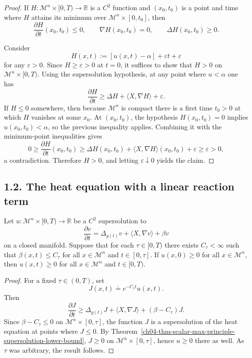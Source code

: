 \begin{proof}
If \(H : \mathcal M^n \times [0,T) \to \mathbb R\) is a \(C^2\) function and \((x_0,t_0)\) is a point and time where \(H\) attains its minimum over \(\mathcal M^n \times [0,t_0]\), then
\[
\frac{\partial H}{\partial t}(x_0,t_0) \le 0,\qquad \nabla H(x_0,t_0)=0,\qquad \Delta H(x_0,t_0)\ge 0.
\]

Consider
\[
H(x,t) := [u(x,t)-\alpha]+\varepsilon t+\varepsilon
\]
for any \(\varepsilon>0\). Since \(H\ge \varepsilon>0\) at \(t=0\), it suffices to show that \(H>0\) on \(\mathcal M^n \times [0,T)\). Using the supersolution hypothesis, at any point where \(u<\alpha\) one has
\[
\frac{\partial H}{\partial t}\ge \Delta H + \langle X,\nabla H\rangle+\varepsilon.
\]
If \(H\le 0\) somewhere, then because \(\mathcal M^n\) is compact there is a first time \(t_0>0\) at which \(H\) vanishes at some \(x_0\). At \((x_0,t_0)\), the hypothesis \(H(x_0,t_0)=0\) implies \(u(x_0,t_0)<\alpha\), so the previous inequality applies. Combining it with the minimum-point inequalities gives
\[
0\ge \frac{\partial H}{\partial t}(x_0,t_0)\ge \Delta H(x_0,t_0)+\langle X,\nabla H\rangle(x_0,t_0)+\varepsilon\ge \varepsilon>0,
\]
a contradiction. Therefore \(H>0\), and letting \(\varepsilon \downarrow 0\) yields the claim.
\end{proof}

\subsection*{1.2. The heat equation with a linear reaction term}

\begin{proposition}
\label{ch04-prop-scalar-max-principle-linear-reaction}
Let \(u : \mathcal M^n \times [0,T) \to \mathbb R\) be a \(C^2\) supersolution to
\[
\frac{\partial v}{\partial t} = \Delta_{g(t)} v + \langle X, \nabla v \rangle + \beta v
\]
on a closed manifold. Suppose that for each \(\tau \in [0,T)\) there exists \(C_\tau<\infty\) such that \(\beta(x,t)\le C_\tau\) for all \(x \in \mathcal M^n\) and \(t \in [0,\tau]\). If \(u(x,0)\ge 0\) for all \(x \in \mathcal M^n\), then \(u(x,t)\ge 0\) for all \(x \in \mathcal M^n\) and \(t \in [0,T)\).
\end{proposition}

\begin{proof}
For a fixed \(\tau\in(0,T)\), set
\[
J(x,t)\doteq e^{-C_\tau t}u(x,t).
\]
Then
\[
\frac{\partial J}{\partial t}\ge \Delta_{g(t)}J+\langle X,\nabla J\rangle+(\beta-C_\tau)J.
\]
Since \(\beta-C_\tau\le 0\) on \(\mathcal M^n\times[0,\tau]\), the function \(J\) is a supersolution of the heat equation at points where \(J\le 0\). By Theorem~\ref{ch04-thm-scalar-max-principle-supersolution-lower-bound}, \(J\ge 0\) on \(\mathcal M^n\times[0,\tau]\), hence \(u\ge 0\) there as well. As \(\tau\) was arbitrary, the result follows.
\end{proof}

